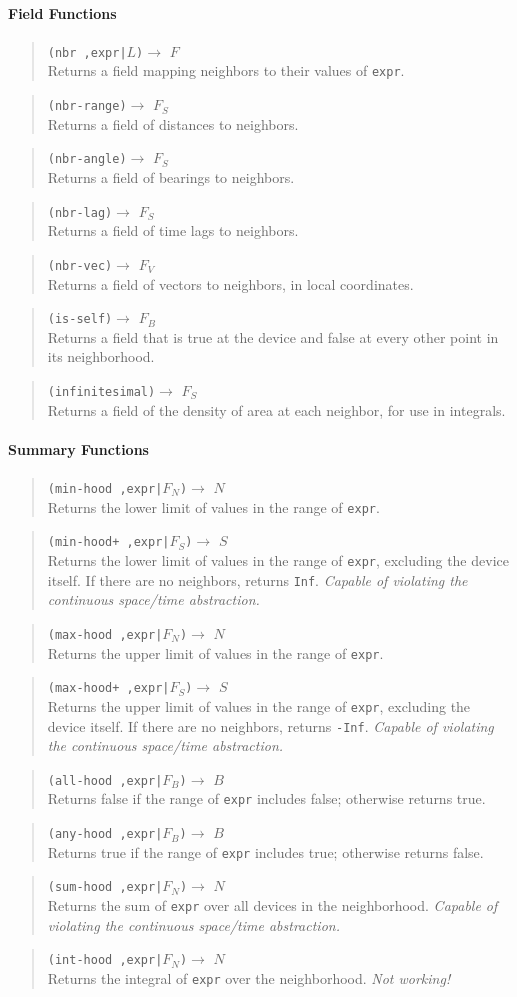 \documentclass{article}
\newcommand\broken{{\em Not working!}}
\newcommand\violation{{\em Capable of violating the continuous
    space/time abstraction.}}
\newcommand\function[3]
{\begin{quote}{\tt #1}$\rightarrow$ \type{#2} \\ #3 \end{quote}}
\newcommand\type[1]{$#1$}
\newcommand\var[1]{{\tt #1}}
\begin{document}
\paragraph{Field Functions}

\function{(nbr ,expr|\type{L})}{F}{Returns a field mapping neighbors
  to their values of \var{expr}.}

\function{(nbr-range)}{F_S}{Returns a field of distances to neighbors.}
\function{(nbr-angle)}{F_S}{Returns a field of bearings to neighbors.}
\function{(nbr-lag)}{F_S}{Returns a field of time lags to neighbors.}
\function{(nbr-vec)}{F_V}{Returns a field of vectors to neighbors, in
  local coordinates.}
\function{(is-self)}{F_B}{Returns a field that is true at the device
  and false at every other point in its neighborhood.}

\function{(infinitesimal)}{F_S}{Returns a field of the density of
  area at each neighbor, for use in integrals.}

\paragraph{Summary Functions}

\function{(min-hood ,expr|\type{F_N})}{N}{Returns the lower limit of
  values in the range of \var{expr}.}
\function{(min-hood+ ,expr|\type{F_S})}{S}{Returns the lower limit of
  values in the range of \var{expr}, excluding the device itself.  
  If there are no neighbors, returns \var{Inf}. \violation{}}
\function{(max-hood ,expr|\type{F_N})}{N}{Returns the upper limit of
  values in the range of \var{expr}.}
\function{(max-hood+ ,expr|\type{F_S})}{S}{Returns the upper limit of
  values in the range of \var{expr}, excluding the device itself.  
  If there are no neighbors, returns \var{-Inf}. \violation{}}

\function{(all-hood ,expr|\type{F_B})}{B}{Returns false if the
  range of \var{expr} includes false; otherwise returns true.}
\function{(any-hood ,expr|\type{F_B})}{B}{Returns true if the
  range of \var{expr} includes true; otherwise returns false.}

\function{(sum-hood ,expr|\type{F_N})}{N}{Returns the sum of
  \var{expr} over all devices in the neighborhood.  \violation{}}
\function{(int-hood ,expr|\type{F_N})}{N}{Returns the integral
  of \var{expr} over the neighborhood.  \broken{}}
\end{document}

